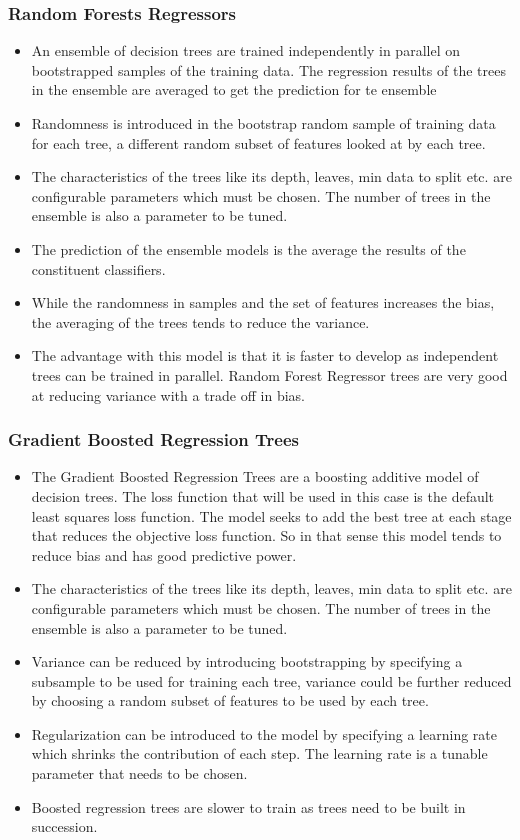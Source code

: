 \documentclass[twoside,12pt]{article}
\begin{document}
\subsubsection{Random Forests Regressors}
\begin{itemize}
	\item
	An ensemble of decision trees are trained independently in parallel on bootstrapped samples of the training data. The regression results of the trees in the ensemble are averaged to get the prediction for te ensemble
	\item
	Randomness is introduced in the bootstrap random sample of training data for each tree, a different random subset of features looked at by each tree.
	\item
	The characteristics of the trees like its depth, leaves, min data to split etc. are configurable parameters which must be chosen. The number of trees in the ensemble is also a parameter to be tuned.
	\item
	The prediction of the ensemble models is the average the results of the constituent classifiers.
	\item
	While the randomness in samples and the set of features increases the bias, the averaging of the trees tends to reduce the variance.
	\item
	The advantage with this model is that it is faster to develop as independent trees can be trained in parallel. Random Forest Regressor trees are very good at reducing variance with a trade off in bias.
\end{itemize}

\subsubsection{Gradient Boosted Regression Trees}
\begin{itemize}
	\item
	The Gradient Boosted Regression Trees are a boosting additive model of decision trees. The loss function that will be used in this case is the default least squares loss function. The model seeks to add the best tree at each stage that reduces the objective loss function. So in that sense this model tends to reduce bias and has good predictive power.
	\item
	The characteristics of the trees like its depth, leaves, min data to split etc. are configurable parameters which must be chosen. The number of trees in the ensemble is also a parameter to be tuned.
	\item
	Variance can be reduced by introducing bootstrapping by specifying a subsample to be used for training each tree, variance could be further reduced by choosing a random subset of features to be used by each tree.
	\item
	Regularization can be introduced to the model by specifying a learning rate which shrinks the contribution of each step. The learning rate is a tunable parameter that needs to be chosen.
	\item
	Boosted regression trees are slower to train as trees need to be built in succession.
\end{itemize}
\end{document}

